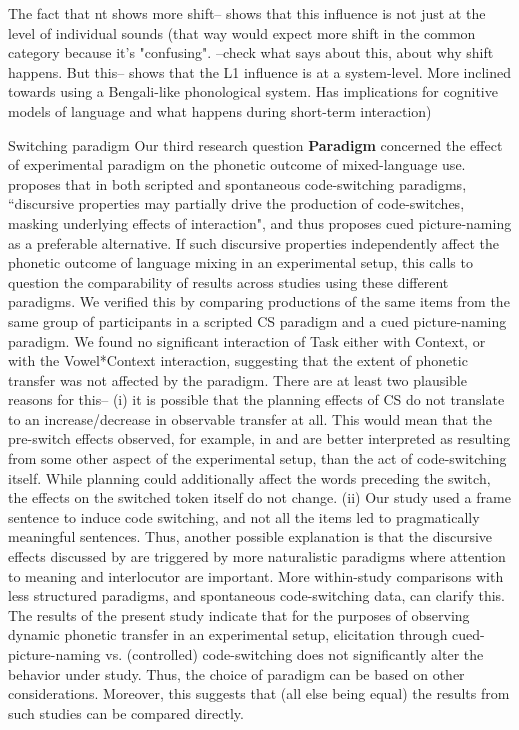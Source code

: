 \documentclass[12 pt]{article}
\begin{document}
\alert{The fact that nt shows more shift-- shows that this influence is not just at the level of individual sounds (that way would expect more shift in the common category because it's "confusing". --check what \cite{simonet2014phonetic} says about this, about why shift happens. But this-- shows that the L1 influence is at a system-level. More inclined towards using a Bengali-like phonological system. Has implications for cognitive models of language and what happens during short-term interaction)}


Switching paradigm
Our third research question \textbf{Paradigm} concerned the effect of experimental paradigm on the phonetic outcome of mixed-language use. \cite{olson2013bilingual} proposes that in both scripted and spontaneous code-switching paradigms, ``discursive properties may partially drive the production of code-switches, masking underlying effects of interaction", and thus proposes cued picture-naming as a preferable alternative. If such discursive properties independently affect the phonetic outcome of language mixing in an experimental setup, this calls to question the comparability of results across studies using these different paradigms. We verified this by comparing productions of the same items from the same group of participants in a scripted CS paradigm and a cued picture-naming paradigm. We found no significant interaction of Task either with Context, or with the Vowel*Context interaction, suggesting that the extent of phonetic transfer was not affected by the paradigm. 
There are at least two plausible reasons for this-- (i) it is possible that the planning effects of CS do not translate to an increase/decrease in observable transfer at all. This would mean that the pre-switch effects observed, for example, in \cite{muldner2019phonetics} and \cite{bullock2009trying} are better interpreted as resulting from some other aspect of the experimental setup, than the act of code-switching itself. While planning could additionally affect the words preceding the switch, the effects on the switched token itself do not change. (ii) Our study used a frame sentence to induce code switching, and not all the items led to pragmatically meaningful sentences. Thus, another possible explanation is that the discursive effects discussed by \cite{olson2013bilingual} are triggered by more naturalistic paradigms where attention to meaning and interlocutor are important. More within-study comparisons with less structured paradigms, and spontaneous code-switching data, can clarify this. The results of the present study indicate that for the purposes of observing dynamic phonetic transfer in an experimental setup, elicitation through cued-picture-naming vs. (controlled) code-switching does not significantly alter the behavior under study. Thus, the choice of paradigm can be based on other considerations. Moreover, this suggests that (all else being equal) the results from such studies can be compared directly. 
\end{document}
